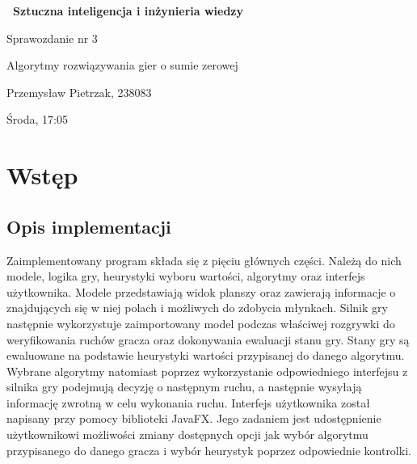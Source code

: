 \documentclass[a4paper,10pt]{article}
\begin{document}
    \begin{titlepage}
     \vspace*{\fill}
    
     \vspace*{-4cm}
     \Huge\bfseries\
     {Sztuczna inteligencja i inżynieria wiedzy}
    
     \LARGE
     \centering
     \vspace{2cm}
     {Sprawozdanie nr 3}
    
     \Large
     \centering
     {Algorytmy rozwiązywania gier o sumie zerowej}
     
     \vspace*{0.5cm}
     
     \centering
     \large 
     \vspace{0.5cm}
     Przemysław Pietrzak, 238083
     
     Środa, 17:05
     
     \vspace*{\fill}
     \restoregeometry
    \end{titlepage}
    
    \tableofcontents
    
    \section{Wstęp}
    \justify
    \subsection{Opis implementacji}
    Zaimplementowany program składa się z pięciu głównych części. Należą do nich modele, logika gry, heurystyki wyboru wartości, algorytmy oraz interfejs użytkownika. Modele przedstawiają widok planszy oraz zawierają informacje o znajdujących się w niej polach i możliwych do zdobycia młynkach. Silnik gry następnie wykorzystuje zaimportowany model podczas właściwej rozgrywki do weryfikowania ruchów gracza oraz dokonywania ewaluacji stanu gry. Stany gry są ewaluowane na podstawie heurystyki wartości przypisanej do danego algorytmu. Wybrane algorytmy natomiast poprzez wykorzystanie odpowiedniego interfejsu z silnika gry podejmują decyzję o następnym ruchu, a następnie wysyłają informację zwrotną w celu wykonania ruchu. Interfejs użytkownika został napisany przy pomocy biblioteki JavaFX. Jego zadaniem jest udostępnienie użytkownikowi możliwości zmiany dostępnych opcji jak wybór algorytmu przypisanego do danego gracza i wybór heurystyk poprzez odpowiednie kontrolki.
    
\end{document}
